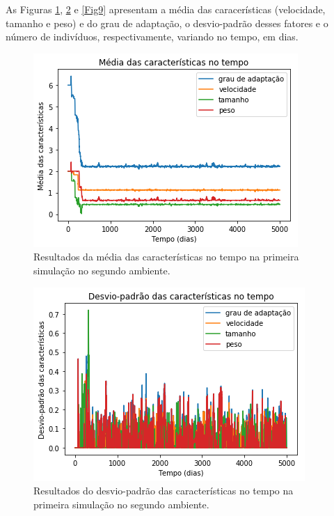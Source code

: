 \documentclass[10pt,brazil,english]{article}
\begin{document}
            As Figuras \ref{Fig7}, \ref{Fig8} e \ref{Fig9} apresentam a média das caracerísticas (velocidade, tamanho e peso) e do grau de adaptação, o desvio-padrão desses fatores e o número de indivíduos, respectivamente, variando no tempo, em dias.
            
            \begin{figure}[!hbtp]
                \begin{center}
                    \includegraphics[scale=0.5]{Images/2-1.png}
                \end{center}
                \caption{Resultados da média das características no tempo na primeira simulação no segundo ambiente.}
                \label{Fig7}
            \end{figure} 
            
            \begin{figure}[!hbtp]
                \begin{center}
                    \includegraphics[scale=0.5]{Images/2-2.png}
                \end{center}
                \caption{Resultados do desvio-padrão das características no tempo na primeira simulação no segundo ambiente.}
                \label{Fig8}
            \end{figure} 
            
\end{document}
